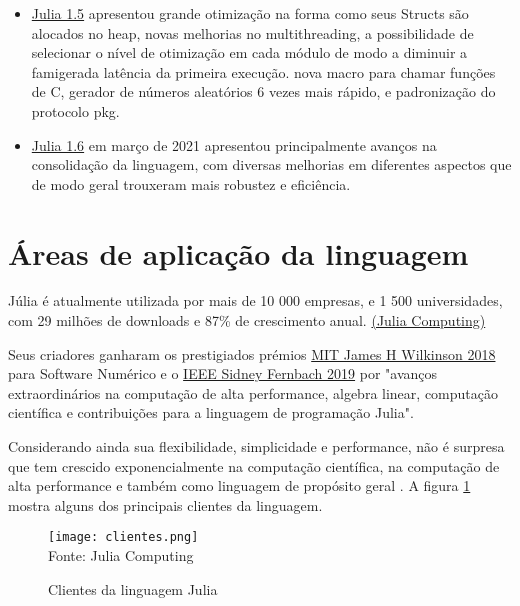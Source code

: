 \begin{itemize}
   \item\href{https://julialang.org/blog/2020/08/julia-1.5-highlights/}{Julia 1.5} apresentou grande otimização na forma como seus Structs são alocados no heap, novas melhorias no multithreading, a possibilidade de selecionar o nível de otimização em cada módulo de modo a diminuir a famigerada latência da primeira execução. nova macro para chamar funções de C, gerador de números aleatórios 6 vezes mais rápido, e padronização do protocolo pkg. 
   \item\href{https://julialang.org/blog/2021/03/julia-1.6-highlights/}{Julia 1.6} em março de 2021 apresentou principalmente avanços na consolidação da linguagem, com diversas melhorias em diferentes aspectos que de modo geral trouxeram mais robustez e eficiência. 
\end{itemize}


\section{Áreas de aplicação da linguagem}
Júlia é atualmente utilizada por mais de 10 000 empresas, e 1 500 universidades, com 29 milhões de downloads e 87\% de  crescimento anual. \href{https://juliacomputing.com/}{(Julia Computing)}

Seus criadores ganharam os prestigiados prémios \href{https://news.mit.edu/2018/julia-language-co-creators-win-james-wilkinson-prize-numerical-software-1226}{MIT James H Wilkinson 2018} para Software Numérico e o \href{[https://www.computer.org/press-room/2019-news/2019-ieee-fernbach-award-edelman](https://www.computer.org/press-room/2019-news/2019-ieee-fernbach-award-edelman)}{IEEE Sidney Fernbach 2019} por "avanços extraordinários na computação de alta performance, algebra linear, computação científica e contribuições para a linguagem de programação Julia". 

Considerando ainda sua flexibilidade, simplicidade e performance, não é surpresa que tem crescido exponencialmente na computação científica, na computação de alta performance e também como linguagem de propósito geral \cite{Klok2021}. A figura \ref{clientes} mostra alguns dos principais clientes da linguagem.
\begin{figure}[H]
   \begin{center}
       \caption{Clientes da linguagem Julia} \label{clientes}
       \texttt{[image: clientes.png]} \\
       {\tiny \sf Fonte: Julia Computing}
   \end{center}
  \end{figure}


